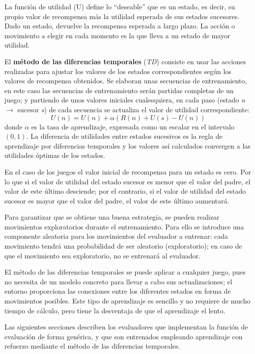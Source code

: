La función de utilidad (U) define lo ``deseable'' que es un estado, es decir, su propio valor de recompensa más la utilidad esperada de sus estados sucesores.
Dado un estado, devuelve la recompensa esperada a largo plazo.
La acción o movimiento a elegir en cada momento es la que lleva a un estado de mayor utilidad.

El \textbf{método de las diferencias temporales} (\textit{TD}) consiste en usar las acciones realizadas para ajustar los valores de los estados correspondientes según los valores de recompensa obtenidos.
Se elaboran unas secuencias de entrenamiento, en este caso las secuencias de entrenamiento serán partidas completas de un juego; y partiendo de unos valores iniciales cualesquiera, en cada paso (estado \textit{n} $\rightarrow$ sucesor \textit{s}) de cada secuencia se actualiza el valor de utilidad correspondiente:
\begin{displaymath}
U(n) = U(n) + \alpha(R(n) + U(s) - U(n))
\end{displaymath}
donde $\alpha$ es la tasa de aprendizaje, expresada como un escalar en el intervalo $(0,1)$.
La diferencia de utilidades entre estados sucesivos es la regla de aprendizaje por diferencias temporales y los valores así calculados convergen a las utilidades óptimas de los estados.

En el caso de los juegos el valor inicial de recompensa para un estado es cero.
Por lo que si el valor de utilidad del estado sucesor es menor que el valor del padre, el valor de este último desciende; por el contrario, si el valor de utilidad del estado sucesor es mayor que el valor del padre, el valor de este último aumentará.

Para garantizar que se obtiene una buena estrategia, se pueden realizar movimientos exploratorios durante el entrenamiento.
Para ello se introduce una componente aleatoria para los movimientos del evaluador a entrenar: cada movimiento tendrá una probabilidad de ser aleatorio (exploratorio); en caso de que el movimiento sea exploratorio, no se entrenará al evaluador.

El método de las diferencias temporales se puede aplicar a cualquier juego, pues no necesita de un modelo concreto para llevar a cabo sus actualizaciones; el entorno proporciona las conexiones entre los diferentes estados en forma de movimientos posibles.
Este tipo de aprendizaje es sencillo y no requiere de mucho tiempo de cálculo, pero tiene la desventaja de que el aprendizaje el lento.

\bigskip
Las siguientes secciones describen los evaluadores que implementan la función de evaluación de forma genérica, y que son entrenados empleando aprendizaje con refuerzo mediante el método de las diferencias temporales.

